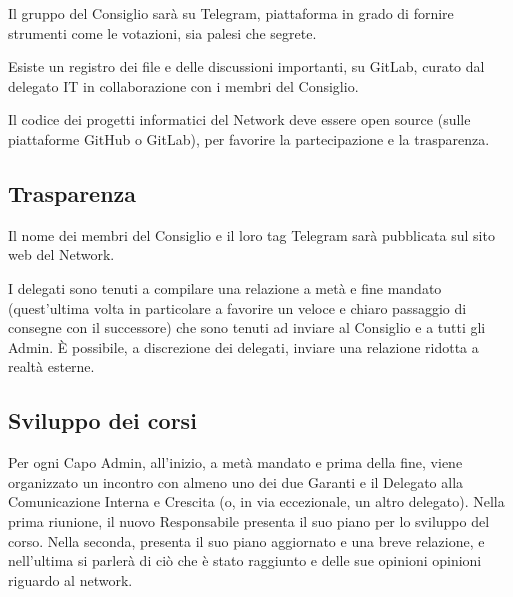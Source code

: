 Il gruppo del Consiglio sarà su Telegram, piattaforma in grado di fornire strumenti come le votazioni, sia palesi che segrete.

Esiste un registro dei file e delle discussioni importanti, su GitLab, curato dal delegato IT in collaborazione con i membri del Consiglio.

Il codice dei progetti informatici del Network deve essere open source (sulle piattaforme GitHub o GitLab), per favorire la partecipazione e la trasparenza.



\subsection{Trasparenza}

Il nome dei membri del Consiglio e il loro tag Telegram sarà pubblicata sul sito web del Network.

I delegati sono tenuti a compilare una relazione a metà e fine mandato (quest'ultima volta in particolare a favorire un veloce e chiaro passaggio di consegne con il successore) che sono tenuti ad inviare al Consiglio e a tutti gli Admin. È possibile, a discrezione dei delegati, inviare una relazione ridotta a realtà esterne.



\subsection{Sviluppo dei corsi}

Per ogni Capo Admin, all'inizio, a metà mandato e prima della fine, viene organizzato un incontro con almeno uno dei due Garanti e il Delegato alla Comunicazione Interna e Crescita (o, in via eccezionale, un altro delegato). Nella prima riunione, il nuovo Responsabile presenta il suo piano per lo sviluppo del corso. Nella seconda, presenta il suo piano aggiornato e una breve relazione, e nell'ultima si parlerà di ciò che è stato raggiunto e delle sue opinioni opinioni riguardo al network.


